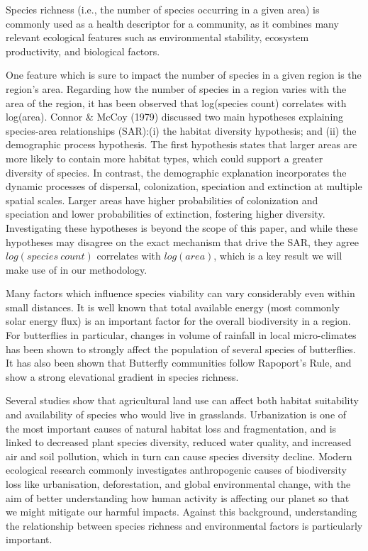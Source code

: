 \documentclass[prl,showpacs,superscriptaddress,twocolumn,longbibliography]{revtex4-1}
\begin{document}
Species richness (i.e., the number of species occurring in a given area) is commonly used as a health descriptor for a community, as it combines many relevant ecological features such as environmental stability, ecosystem productivity, and biological factors\cite{Park2003}.

One feature which is sure to impact the number of species in a given region is the region's area. Regarding how the number of species in a region varies with the area of the region, it has been observed that log(species count) correlates with log(area)\cite{connor_2001_sar}. Connor \& McCoy (1979) discussed two main hypotheses explaining species-area relationships (SAR):(i) the habitat diversity hypothesis; and (ii) the demographic process hypothesis. The first hypothesis states that larger areas are more likely to contain more habitat types, which could support a greater diversity of species. In contrast, the demographic explanation incorporates the dynamic processes of dispersal, colonization, speciation and extinction at multiple spatial scales. Larger areas have higher probabilities of colonization and speciation and lower probabilities of extinction, fostering higher diversity\cite{drakare_impint_2006}.  Investigating these hypotheses is beyond the scope of this paper, and while these hypotheses may disagree on the exact mechanism that drive the SAR, they agree $log(species \: count)$ correlates with $log(area)$, which is a key result we will make use of in our methodology.

Many factors which influence species viability can vary considerably even within small distances\cite{john_wiley__sons_ltd_species_2007}. It is well known that total available energy (most commonly solar energy flux) is an important factor for the overall biodiversity in a region\cite{hawkins_energy_2003, currie_energy_1991}. For butterflies in particular, changes in volume of rainfall in local micro-climates has been shown to strongly affect the population of several species of butterflies\cite{Haneda2019}. It has also been shown that Butterfly communities follow Rapoport's Rule, and show a strong elevational gradient in species richness\cite{fleishman_empirical_1998, Arturo}. 

Several studies show that agricultural land use can affect both habitat suitability and availability of species who would live in grasslands\cite{smith}. Urbanization is one of the most important causes of natural habitat loss and fragmentation, and is linked to decreased plant species diversity, reduced water quality, and increased air and soil pollution, which in turn can cause species diversity decline\cite{smith,Tzortzakaki2019}. 
Modern ecological research commonly investigates anthropogenic causes of biodiversity loss like urbanisation, deforestation, and global environmental change, with the aim of better understanding how human activity is affecting our planet so that we might mitigate our harmful impacts\cite{hill_responses_2002, munguira_conservation_1995, white_human_2007, sanchez-bayo_worldwide_2019}. Against this background, understanding the relationship between species richness and environmental factors is particularly important. 
\end{document}
